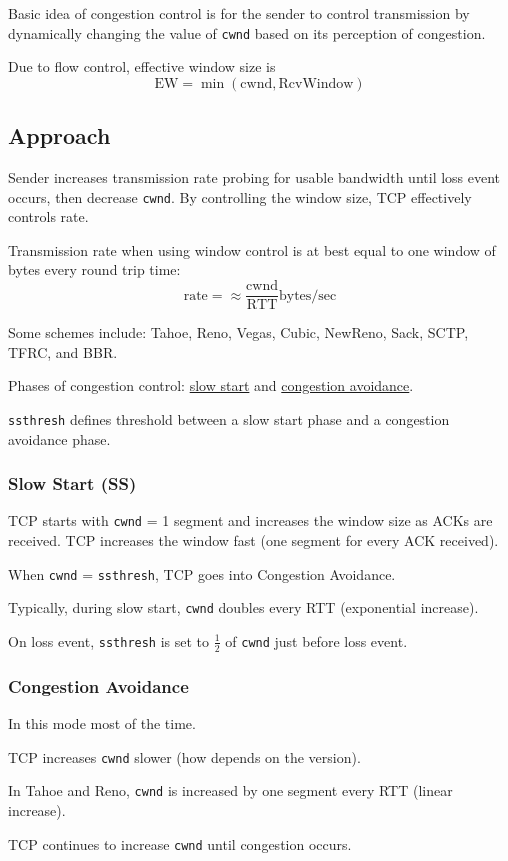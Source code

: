 \documentclass[11pt]{article}
\begin{document}
Basic idea of congestion control is for the sender to control transmission by dynamically
changing the value of \texttt{cwnd} based on its perception of congestion.

Due to flow control, effective window size is
$$ \text{EW} = \min( \text{cwnd}, \text{RcvWindow} ) $$
\subsection{Approach}
\label{sec:org8daffb3}
Sender increases transmission rate probing for usable bandwidth until loss event occurs,
then decrease \texttt{cwnd}.
By controlling the window size, TCP effectively controls rate.

Transmission rate when using window control is at best equal to one window of bytes every
round trip time:
$$ \text{rate} = \approx \frac{\text{cwnd}}{\text{RTT}} \text{bytes/sec} $$

Some schemes include: Tahoe, Reno, Vegas, Cubic, NewReno, Sack, SCTP, TFRC, and BBR.

Phases of congestion control: \uline{slow start} and \uline{congestion avoidance}.

\texttt{ssthresh} defines threshold between a slow start phase and a congestion avoidance phase.
\subsubsection{Slow Start (SS)}
\label{sec:org907f2f8}
TCP starts with \texttt{cwnd} = 1 segment and increases the window size as ACKs are received.
TCP increases the window fast (one segment for every ACK received).

When \texttt{cwnd} = \texttt{ssthresh}, TCP goes into Congestion Avoidance.

Typically, during slow start, \texttt{cwnd} doubles every RTT (exponential increase).

On loss event, \texttt{ssthresh} is set to \(\frac{1}{2}\) of \texttt{cwnd} just before loss event.
\subsubsection{Congestion Avoidance}
\label{sec:org7e8f908}
In this mode most of the time.

TCP increases \texttt{cwnd} slower (how depends on the version).

In Tahoe and Reno, \texttt{cwnd} is increased by one segment every RTT (linear increase).

TCP continues to increase \texttt{cwnd} until congestion occurs.
\end{document}
